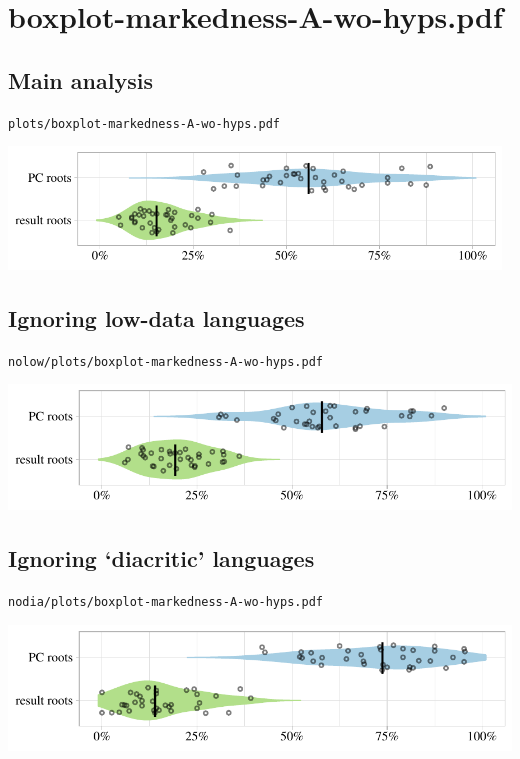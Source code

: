 \eject

\section{boxplot-markedness-A-wo-hyps.pdf}

\subsection{Main analysis}

\texttt{plots/boxplot-markedness-A-wo-hyps.pdf}

\includegraphics[width=0.98\textwidth]{../plots/boxplot-markedness-A-wo-hyps.pdf}

\subsection{Ignoring low-data languages}

\texttt{nolow/plots/boxplot-markedness-A-wo-hyps.pdf}

\includegraphics[width=1.0\textwidth]{../nolow/plots/boxplot-markedness-A-wo-hyps.pdf}

\subsection{Ignoring `diacritic' languages}

\texttt{nodia/plots/boxplot-markedness-A-wo-hyps.pdf}

\includegraphics[width=1.0\textwidth]{../nodia/plots/boxplot-markedness-A-wo-hyps.pdf}

